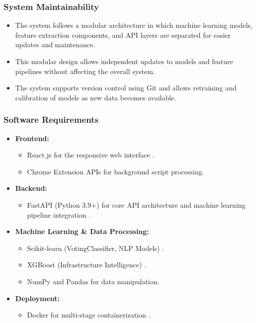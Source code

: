 \subsubsection*{System Maintainability}

\begin{itemize}
    \item The system follows a modular architecture in which machine learning models, feature extraction components, and API layers are separated for easier updates and maintenance.
    
    \item This modular design allows independent updates to models and feature pipelines without affecting the overall system.
    
    \item The system supports version control using Git and allows retraining and calibration of models as new data becomes available.
\end{itemize}

\subsubsection*{Software Requirements}

\begin{itemize}
    \item \textbf{Frontend:}
    \begin{itemize}
        \item React.js for the responsive web interface \cite{ref9}.
        \item Chrome Extension APIs for background script processing.
    \end{itemize}
    
    \item \textbf{Backend:}
    \begin{itemize}
        \item FastAPI (Python 3.9+) for core API architecture and machine learning pipeline integration \cite{ref10}.
    \end{itemize}
    
    \item \textbf{Machine Learning \& Data Processing:}
    \begin{itemize}
        \item Scikit-learn (VotingClassifier, NLP Models) \cite{ref11}.
        \item XGBoost (Infrastructure Intelligence) \cite{ref12, ref13}.
        \item NumPy and Pandas for data manipulation.
    \end{itemize}
    
    \item \textbf{Deployment:}
    \begin{itemize}
        \item Docker for multi-stage containerization \cite{ref14}.
    \end{itemize}
\end{itemize}

